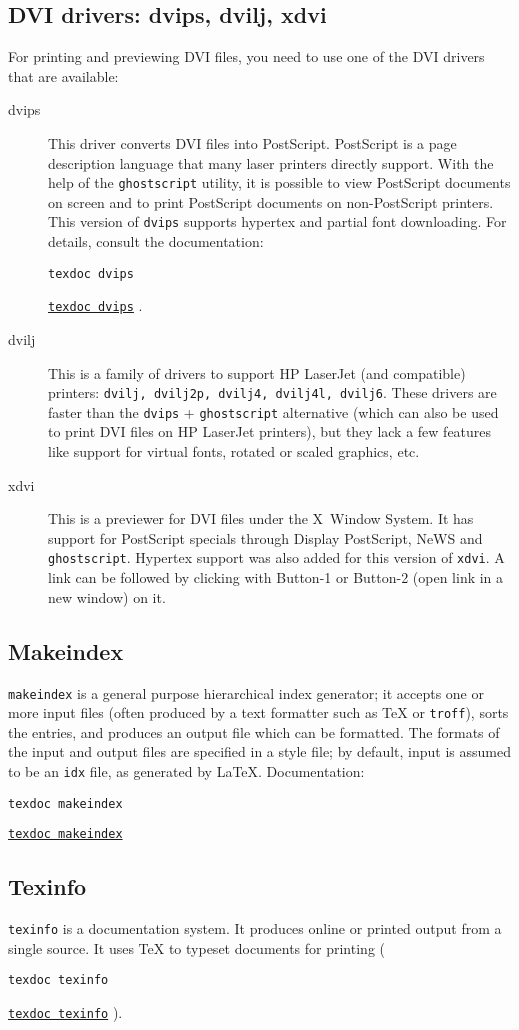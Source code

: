 \documentclass[11pt,a4paper]{article}
\newif\ifpdfoutput
\newcommand{\pdfext}{pdf}
\newcommand{\dviext}{dvi}
\newcommand{\dlink}[3]{%
  \ifpdfoutput
    \ifx\pdfext#3
      \href{#1/#2.#3}{\texttt{texdoc #2}}%
    \else
      \texttt{texdoc #2}%
    \fi
  \else
     \href{#1/#2.#3}{\mbox{\texttt{texdoc #2}}}%
  \fi}
\begin{document}
\subsection{DVI drivers: dvips, dvilj, xdvi}
For printing and previewing DVI files, you need to use one of the DVI
drivers that are available:
\begin{description}
\item [dvips] This driver converts DVI files into PostScript.
  PostScript is a page description language that many laser printers
  directly support. With the help of the \texttt{ghostscript} utility,
  it is possible to view PostScript documents on screen and to print
  PostScript documents on non-PostScript printers. This version of
  \texttt{dvips} supports hypertex and partial font downloading. For
  details, consult the documentation: \dlink{../programs}{dvips}{\dviext}.
\item [dvilj] This is a family of drivers to support HP LaserJet (and
  compatible) printers: \texttt{dvilj, dvilj2p, dvilj4, dvilj4l,
    dvilj6}. These drivers are faster than the \texttt{dvips} +
  \texttt{ghostscript} alternative (which can also be used to print
  DVI files on HP LaserJet printers), but they lack a few features
  like support for virtual fonts, rotated or scaled graphics, etc.
\item [xdvi] This is a previewer for DVI files under the X~Window
  System. It has support for PostScript specials through Display
  PostScript, NeWS and \texttt{ghostscript}. Hypertex support was also
  added for this version of \texttt{xdvi}. A link can be followed by
  clicking with Button-1 or Button-2 (open link in a new window) on
  it.
\end{description}


\subsection{Makeindex}
\texttt{makeindex} is a general purpose hierarchical index generator;
it accepts one or more input files (often produced by a text formatter
such as \TeX{} or \texttt{troff}), sorts the entries, and produces an
output file which can be formatted.  The formats of the input and
output files are specified in a style file; by default, input is
assumed to be an \texttt{idx} file, as generated by \LaTeX.
Documentation: \dlink{../makeindex}{makeindex}{\dviext}

\subsection{Texinfo}
\texttt{texinfo} is a documentation system. It produces online or
printed output from a single source. It uses \TeX{} to typeset
documents for printing (\dlink{../programs}{texinfo}{\dviext}).
\end{document}

